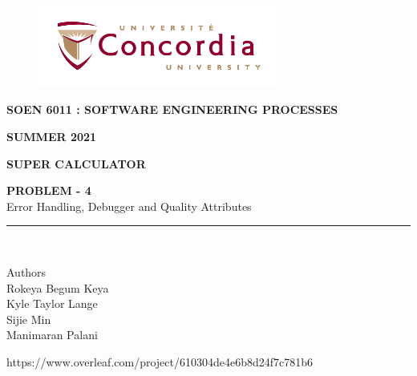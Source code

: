 \documentclass[letterpaper, 11pt]{report}
\begin{document}
\begin{titlepage}
\vspace*{0.7in}
\begin{center}
\begin{figure}[htb]
\begin{center}
\includegraphics[width=8cm]{univ_logo}
\end{center}
\end{figure}
\vspace*{0.3in}
\begin{Large}
\textbf{SOEN 6011 : SOFTWARE ENGINEERING PROCESSES} \\
\end{Large}
\vspace*{0.1in}
\begin{Large}
\textbf{SUMMER 2021} \\
\end{Large}
\vspace*{0.9in}
\begin{Large}
\textbf{SUPER CALCULATOR} \\
\end{Large}
\vspace*{0.9in}
\begin{Large} 


\textbf{PROBLEM - 4} \\
Error Handling, Debugger and Quality Attributes\\
\end{Large}
\vspace*{0.625in}
\rule{80mm}{0.1mm}\\
\vspace*{0.1in}
\begin{large}
Authors \\
\vspace*{0.1in}
Rokeya Begum Keya\\
\vspace*{0.1in}
Kyle Taylor Lange\\
\vspace*{0.1in}
Sijie Min\\
\vspace*{0.1in}
Manimaran Palani\\ 
\vspace*{0.3in}
\date{\normalsize\today} 
\end{large}
\end{center}
\begin{center}
https://www.overleaf.com/project/610304de4e6b8d24f7c781b6\end{center}
\end{titlepage}
\pagebreak
\end{document}
